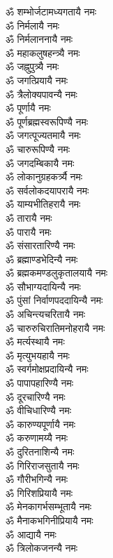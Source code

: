 \begin{multicols}{2}
\begin{flushleft}
ॐ शम्भोर्जटामध्यगतायै नमः\\
ॐ निर्मलायै नमः\hfill{}\\
ॐ निर्मलाननायै नमः\\
ॐ महाकलुषहन्त्र्यै नमः\\
ॐ जह्नुपुत्र्यै नमः\\
ॐ जगत्प्रियायै नमः\\
ॐ त्रैलोक्यपावन्यै नमः\\
ॐ पूर्णायै नमः\\
ॐ पूर्णब्रह्मस्वरूपिण्यै नमः\\
ॐ जगत्पूज्यतमायै नमः\\
ॐ चारुरूपिण्यै नमः\\
ॐ जगदम्बिकायै नमः\hfill{}\\
ॐ लोकानुग्रहकर्त्र्यै नमः\\
ॐ सर्वलोकदयापरायै नमः\\
ॐ याम्यभीतिहरायै नमः\\
ॐ तारायै नमः\\
ॐ पारायै नमः\\
ॐ संसारतारिण्यै नमः\\
ॐ ब्रह्माण्डभेदिन्यै नमः\\
ॐ ब्रह्मकमण्डलुकृतालयायै नमः\\
ॐ सौभाग्यदायिन्यै नमः\\
ॐ पुंसां निर्वाणपददायिन्यै नमः\hfill{}\\
ॐ अचिन्त्यचरितायै नमः\\
ॐ चारुरुचिरातिमनोहरायै नमः\\
ॐ मर्त्यस्थायै नमः\\
ॐ मृत्युभयहायै नमः\\
ॐ स्वर्गमोक्षप्रदायिन्यै नमः\\
ॐ पापापहारिण्यै नमः\\
ॐ दूरचारिण्यै नमः\\
ॐ वीचिधारिण्यै नमः\\
ॐ कारुण्यपूर्णायै नमः\\
ॐ करुणामय्यै नमः\hfill{}\\
ॐ दुरितनाशिन्यै नमः\\
ॐ गिरिराजसुतायै नमः\\
ॐ गौरीभगिन्यै नमः\\
ॐ गिरिशप्रियायै नमः\\
ॐ मेनकागर्भसम्भूतायै नमः\\
ॐ मैनाकभगिनीप्रियायै नमः\\
ॐ आद्यायै नमः\\
ॐ त्रिलोकजनन्यै नमः\\

\end{flushleft}
\end{multicols}
